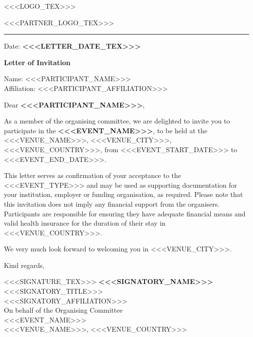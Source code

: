 \documentclass[a4paper,11pt]{article}
\begin{document}
\begin{minipage}[c][22mm][c]{0.5\textwidth}
<<<LOGO_TEX>>>
\end{minipage}%
\begin{minipage}[c][22mm][c]{0.5\textwidth}
\raggedleft <<<PARTNER_LOGO_TEX>>>
\end{minipage}

{\color{headrule}\rule{\textwidth}{0.6pt}}

\hfill Date: \textbf{\color{accent}<<<LETTER_DATE_TEX>>>}

\vspace{4mm}
{\large\bfseries Letter of Invitation}

Name: <<<PARTICIPANT_NAME>>>\\
Affiliation: <<<PARTICIPANT_AFFILIATION>>>

\vspace{2mm}
Dear \textbf{\color{accent}<<<PARTICIPANT_NAME>>>},

As a member of the organising committee, we are delighted to invite you to
participate in the \textbf{<<<EVENT_NAME>>>}, to be held at the
<<<VENUE_NAME>>>, <<<VENUE_CITY>>>, <<<VENUE_COUNTRY>>>, from
<<<EVENT_START_DATE>>> to <<<EVENT_END_DATE>>>.

This letter serves as confirmation of your acceptance to the <<<EVENT_TYPE>>>
and may be used as supporting documentation for your institution, employer or
funding organisation, as required. Please note that this invitation does not
imply any financial support from the organisers. Participants are responsible
for ensuring they have adequate financial means and valid health insurance for
the duration of their stay in <<<VENUE_COUNTRY>>>.

We very much look forward to welcoming you in <<<VENUE_CITY>>>.

Kind regards,

\vspace{4mm}
<<<SIGNATURE_TEX>>>
\textbf{<<<SIGNATORY_NAME>>>}\\
<<<SIGNATORY_TITLE>>>\\
<<<SIGNATORY_AFFILIATION>>>\\
On behalf of the Organising Committee\\
<<<EVENT_NAME>>>\\
<<<VENUE_NAME>>>, <<<VENUE_COUNTRY>>>
\end{document}
